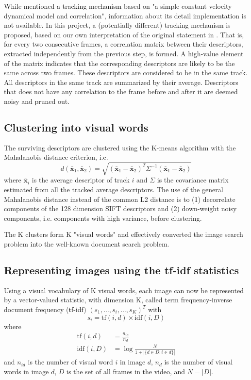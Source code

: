 \documentclass[conference]{IEEEtran}
\begin{document}
While \cite{sivic2003video} mentioned a tracking mechanism based on "a simple constant velocity dynamical model and correlation", 
information about its detail implementation is not available. In this project, a (potentially different) tracking mechanism is proposed, based on our own 
interpretation of the original statement in \cite{sivic2003video}. That is, for every two consecutive frames, a correlation matrix between 
their descriptors, extracted independently from the previous step, is formed. 
A high-value element of the matrix 
indicates that the corresponding descriptors are likely to be the same across two frames. These descriptors are considered to be in the same track. 
All descriptors in the same track are summarized by their average. Descriptors that does not 
have any correlation to the frame before and after it are deemed noisy and pruned out.

\subsection{Clustering into visual words}
The surviving descriptors are clustered using the K-means algorithm with the Mahalanobis distance criterion, i.e.
$$
d(\bar{\mathbf{x}}_1, \bar{\mathbf{x}}_2) = \sqrt{(\bar{\mathbf{x}}_1  - \bar{\mathbf{x}}_2)^T\Sigma^{-1}
(\bar{\mathbf{x}}_1  - \bar{\mathbf{x}}_2)}
$$
where $\bar{\mathbf{x}}_i$ is the average descriptor of track $i$ and $\Sigma$ is the covariance matrix estimated from 
all the tracked  average descriptors. The use of the general Mahalanobis distance instead of the common L2 distance is to (1) decorrelate
components of the 128 dimension SIFT descriptors and (2) down-weight noisy components, i.e. components with high variance, before clustering.


The K clusters form K "visual words" and effectively converted the image search problem into the well-known document search problem.

\subsection{Representing images using the tf-idf statistics}
Using a visual vocabulary of K visual words, each image can now be represented by a vector-valued statistic, with dimension K, called term 
frequency-inverse document frequency (tf-idf) \cite{salton1983introduction, salton1988term} $(s_1, \dots, s_i, \dots, s_K)^T$ with
$$
s_i = \text{tf}(i, d) \times \text{idf}(i, D)
$$
where 
$$
\begin{aligned}
\text{tf}(i, d) &= \frac{n_{id}}{n_d}\\
\text{idf}(i, D) &= \log\frac{N}{1+|\{d\in D: i\in d\}|}
\end{aligned}
$$
and $n_{id}$ is the number of visual word $i$ in image $d$, $n_d$ is the number of visual words in image $d$, $D$ is the set of all frames
in the video, and $N = |D|$.
\end{document}
